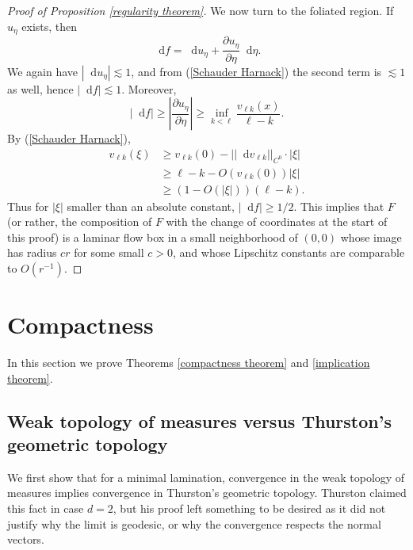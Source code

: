 \documentclass[reqno,11pt]{amsart}
\newcommand*\dif{\mathop{}\!\mathrm{d}}
\theoremstyle{definition}
\numberwithin{equation}{section}
\begin{document}
\begin{proof}[Proof of Proposition \ref{regularity theorem}]
We now turn to the foliated region. If $u_\eta$ exists, then
$$\dif f = \dif u_\eta + \frac{\partial u_\eta}{\partial \eta} \dif \eta.$$
We again have $|\dif u_\eta| \lesssim 1$, and from (\ref{Schauder Harnack}) the second term is $\lesssim 1$ as well, hence $|\dif f| \lesssim 1$.
Moreover, 
$$|\dif f| \geq \left|\frac{\partial u_\eta}{\partial \eta}\right| \geq \inf_{k < \ell} \frac{v_{\ell k}(x)}{\ell - k}.$$
By (\ref{Schauder Harnack}),
\begin{align*}
	v_{\ell k}(\xi) &\geq v_{\ell k}(0) - ||\dif v_{\ell k}||_{C^0} \cdot |\xi| \\
	&\geq \ell - k - O(v_{\ell k}(0)) |\xi| \\
	&\geq (1 - O(|\xi|)) (\ell - k).
\end{align*}
Thus for $|\xi|$ smaller than an absolute constant, $|\dif f| \geq 1/2$.
This implies that $F$ (or rather, the composition of $F$ with the change of coordinates at the start of this proof) is a laminar flow box in a small neighborhood of $(0, 0)$ whose image has radius $cr$ for some small $c > 0$, and whose Lipschitz constants are comparable to $O(r^{-1})$.
\end{proof}

\section{Compactness}\label{CompactnessSec}
In this section we prove Theorems \ref{compactness theorem} and \ref{implication theorem}.

\subsection{Weak topology of measures versus Thurston's geometric topology}
We first show that for a minimal lamination, convergence in the weak topology of measures implies convergence in Thurston's geometric topology.
Thurston claimed this fact \cite[Proposition 8.10.3]{thurston1979geometry} in case $d = 2$, but his proof left something to be desired as it did not justify why the limit is geodesic, or why the convergence respects the normal vectors.
\end{document}
